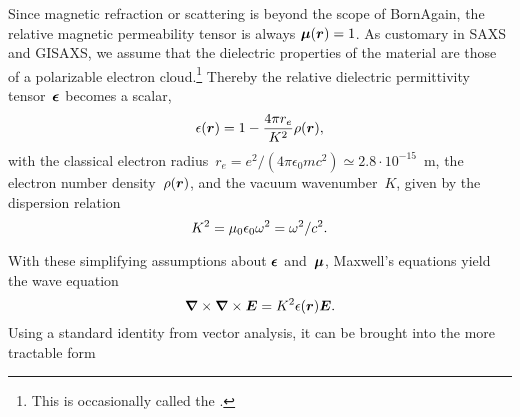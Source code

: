 Since magnetic refraction or scattering is beyond the scope of BornAgain,
the relative magnetic permeability tensor is always $\bm{\mu}(\bm{r})=1$.
%
%
As customary in SAXS and GISAXS,
%
%
we assume
that the dielectric properties of the material are those of a polarizable electron cloud.\footnote
{This is occasionally called the 
%
 \cite{Lau31}.}
Thereby the relative dielectric permittivity tensor~$\bm{\epsilon}$
%
%
becomes a scalar,
\begin{equation}
  \epsilon(\bm{r})=1-\frac{4\pi r_e}{K^2}\rho(\bm{r}),
\end{equation}
%
%
with the classical electron radius~$r_e=e^2/(4\pi\epsilon_0 mc^2)\simeq2.8\cdot10^{-15}$~m,
%
%
%
the electron number density~$\rho(\bm{r})$,
%
%
%
and the vacuum wavenumber~$K$,
given by the dispersion relation
\begin{equation}
  K^2 = \mu_0\epsilon_0\omega^2 = \omega^2/c^2.
\end{equation}
%

With these simplifying assumptions about $\bm{\epsilon}$ and~$\bm{\mu}$,
Maxwell's equations yield the wave equation
\begin{equation}\label{ENabCrossNabE}
  \bm{\nabla}\times\bm{\nabla}\times\bm{E} = K^2\epsilon(\bm{r})\bm{E}.
\end{equation}
%
%
Using a standard identity from vector analysis, it can be brought into the more tractable form

